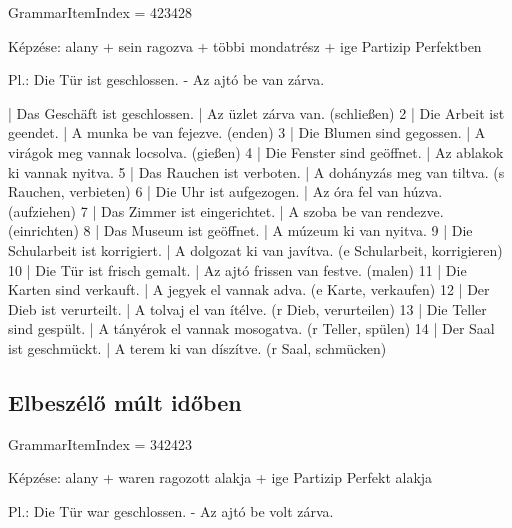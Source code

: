 \documentclass{article}
\newenvironment{desc}{\verbatim}{\endverbatim}
\newenvironment{exmp}{\verbatim}{\endverbatim}
\begin{document}
GrammarItemIndex = 423428

\begin{desc}
Képzése:
alany + sein ragozva + többi mondatrész + ige Partizip Perfektben

Pl.: Die Tür ist geschlossen. - Az ajtó be van zárva.
\end{desc}

\begin{exmp}
1 | Das Geschäft ist geschlossen. | Az üzlet zárva van. (schließen)
2 | Die Arbeit ist geendet. | A munka be van fejezve. (enden)
3 | Die Blumen sind gegossen. | A virágok meg vannak locsolva. (gießen)
4 | Die Fenster sind geöffnet. | Az ablakok ki vannak nyitva.
5 | Das Rauchen ist verboten. | A dohányzás meg van tiltva. (s Rauchen, verbieten)
6 | Die Uhr ist aufgezogen. | Az óra fel van húzva. (aufziehen)
7 | Das Zimmer ist eingerichtet. | A szoba be van rendezve. (einrichten) 
8 | Das Museum ist geöffnet. | A múzeum ki van nyitva.
9 | Die Schularbeit ist korrigiert. | A dolgozat ki van javítva. (e Schularbeit, korrigieren)
10 | Die Tür ist frisch gemalt. | Az ajtó frissen van festve. (malen)
11 | Die Karten sind verkauft. | A jegyek el vannak adva. (e Karte, verkaufen)
12 | Der Dieb ist verurteilt. | A tolvaj el van ítélve. (r Dieb, verurteilen)
13 | Die Teller sind gespült. | A tányérok el vannak mosogatva. (r Teller, spülen)
14 | Der Saal ist geschmückt. | A terem ki van díszítve. (r Saal, schmücken)
\end{exmp}

\subsection{Elbeszélő múlt időben}

GrammarItemIndex = 342423

\begin{desc}
Képzése:
alany + waren ragozott alakja + ige Partizip Perfekt alakja

Pl.: Die Tür war geschlossen. - Az ajtó be volt zárva.
\end{desc}
\end{document}
